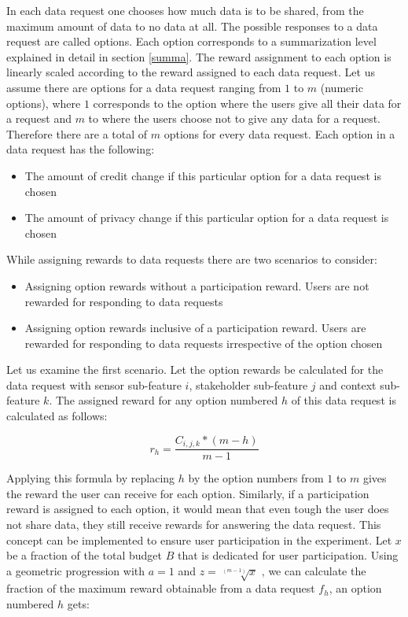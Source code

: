 In each data request one chooses how much data is to be shared, from the maximum amount of data to no data at all. The possible responses to a data request are called options. Each option corresponds to a summarization level explained in detail in section \ref{summa}. The reward assignment to each option is linearly scaled according
to the reward assigned to each data request. Let us assume there are options for a data request ranging from $1$ to $m$ (numeric options), where $1$ corresponds to the option where the users give all their data for a request and $m$ to where the users choose not to give any data for a request. Therefore there are a total of $m$ options for every data request. Each option in a data request has the following:

\begin{itemize}
\item The amount of credit change if this particular option for a data request is chosen
\item The amount of privacy change if this particular option for a data request is chosen
\end{itemize}

While assigning rewards to data requests there are two scenarios to consider:

\begin{itemize}
\item Assigning option rewards without a participation reward. Users are not rewarded for responding to data requests
\item Assigning option rewards inclusive of a participation reward. Users are rewarded for responding to data requests irrespective of the option chosen
\end{itemize}

Let us examine the first scenario. Let the option rewards be calculated for the data request with sensor sub-feature $i$, stakeholder sub-feature $j$ and
context sub-feature $k$. The assigned reward for any option numbered $h$ of this data request is calculated as follows:

\begin{equation}
r_{h} =  \frac{C_{i,j,k}*(m-h)}{m-1}
\end{equation}

Applying this formula by replacing $h$ by the option numbers from $1$ to $m$ gives the reward the user can receive for each option.
Similarly, if a participation reward is assigned to each option, it would mean that even tough the user does not share data, they still
receive rewards for answering the data request. This concept can be implemented to ensure user participation in the experiment. Let $x$ be a fraction of the total budget $B$ that is dedicated for user participation. Using a geometric progression with $a=1$ and $z=\sqrt[(m-1)]{x}$ , we can calculate the fraction of the maximum reward obtainable from a data request $f_{h}$, an option numbered $h$ gets:

